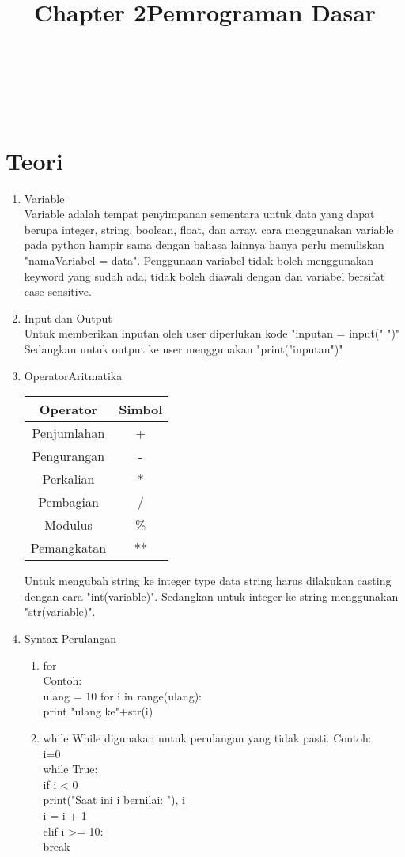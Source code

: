 \begin{center}
\title{\LARGE\bf Chapter 2}\\
\title{\LARGE \bf Pemrograman Dasar}\\
\end{center}

\appendix
\section{Teori}

\begin{enumerate}
\item Variable\\ 
Variable adalah tempat penyimpanan sementara untuk data yang dapat berupa integer, string, boolean, float, dan array. cara menggunakan variable pada python hampir sama dengan bahasa lainnya hanya perlu menuliskan "nama\textunderscore Variabel = data". Penggunaan variabel tidak boleh menggunakan keyword yang sudah ada, tidak boleh diawali dengan \textunderscore dan variabel bersifat case sensitive.

\item Input dan Output\\
Untuk memberikan inputan oleh user diperlukan kode "inputan = input(" ")"\\
Sedangkan untuk output ke user menggunakan "print("inputan")"

\item OperatorAritmatika\\
\begin{tabular}{|c|c|}
\hline
Operator & Simbol\\
\hline
Penjumlahan & +\\
\hline
Pengurangan & -\\
\hline
Perkalian & *\\
\hline
Pembagian & /\\
\hline
Modulus & \% \\
\hline
Pemangkatan & **\\ 
\hline
\end{tabular}

Untuk mengubah string ke integer type data string harus dilakukan casting dengan cara "int(variable)". Sedangkan untuk integer ke string menggunakan "str(variable)".

\item Syntax Perulangan
\begin{enumerate}[label=\alph*.]
\item for\\
Contoh:\\ 
ulang = 10
for i in range(ulang):\\
print "ulang ke"+str(i)
\item while
While digunakan untuk perulangan yang tidak pasti. Contoh:\\
i=0\\
while True:\\
	if i < 0\\
		print("Saat ini i bernilai: "), i\\
		i = i + 1\\
	elif i >= 10:\\
		break\\


\end{enumerate}
\end{enumerate}
